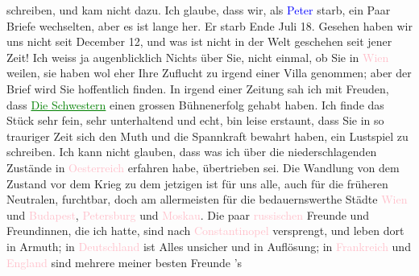                schreiben, und kam nicht dazu.\pend
           \pstart
           Ich glaube, dass wir, als \textcolor{blue}{Peter}{}\ledrightnote{\textcolor{blue}{Peter Nansen}} starb, ein Paar
               Briefe wechselten, aber es ist lange her. Er starb Ende Juli 18. Gesehen
               haben wir uns nicht seit December 12, und was ist nicht in der Welt
               geschehen seit jener Zeit!\pend
           \pstart
           Ich weiss ja augenblicklich Nichts über Sie, nicht einmal, ob Sie in \textcolor{pink}{Wien}{}\ledrightnote{\textcolor{pink}{Wien}} weilen, sie haben wol eher Ihre Zuflucht zu irgend einer
               Villa genommen; aber der Brief wird Sie hoffentlich finden.\pend
           \pstart
           In irgend einer Zeitung sah ich mit Freuden, dass \textcolor{green}{\uline{Die Schwestern}}{}\ledrightnote{\textcolor{green}{Die Schwestern oder Casanova in Spa. Lustspiel in Versen}} einen grossen Bühnenerfolg gehabt haben. Ich finde das Stück sehr fein, sehr
               unterhaltend und echt, bin leise erstaunt, {\pb}dass Sie in so trauriger Zeit sich
               den Muth und die Spannkraft bewahrt haben, ein Lustspiel zu schreiben. Ich kann nicht
               glauben, dass was ich über die niederschlagenden Zustände in \textcolor{pink}{Oesterreich}{}\ledrightnote{\textcolor{pink}{Österreich}} erfahren habe, übertrieben sei. Die Wandlung von dem
               Zustand vor dem Krieg zu dem jetzigen ist für uns alle, auch für die früheren
               Neutralen, furchtbar, doch am allermeisten für die bedauernswerthe Städte \textcolor{pink}{Wien}{}\ledrightnote{\textcolor{pink}{Wien}} und \textcolor{pink}{Budapest}{}\ledrightnote{\textcolor{pink}{Budapest}},
                  \textcolor{pink}{Petersburg}{}\ledrightnote{\textcolor{pink}{Sankt Petersburg}} und \textcolor{pink}{Moskau}{}\ledrightnote{\textcolor{pink}{Moskau}}. Die paar \textcolor{pink}{russischen}{}\ledrightnote{\textcolor{pink}{Russland}} Freunde und
               Freundinnen, die ich hatte, sind nach \textcolor{pink}{Constantinopel}{}\ledrightnote{\textcolor{pink}{Istanbul}}
               versprengt, und leben dort in Armuth; in \textcolor{pink}{Deutschland}{}\ledrightnote{\textcolor{pink}{Deutschland}}
               ist Alles unsicher und in Auflösung; in \textcolor{pink}{Frankreich}{}\ledrightnote{\textcolor{pink}{Frankreich}}
               und \textcolor{pink}{England}{}\ledrightnote{\textcolor{pink}{England}} sind mehrere meiner besten Freunde
                  \label{K_L02342_1v}\label{K_L02342_1h}’s
